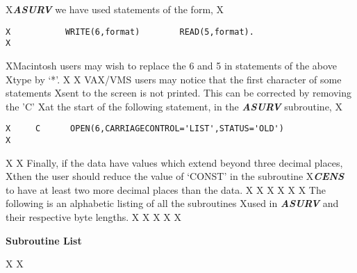 X{\sl\bf ASURV} we have used statements of the form,
X\begin{verbatim}
X           WRITE(6,format)        READ(5,format).
X\end{verbatim}
XMacintosh users may wish to replace the 6 and 5 in statements of the above
Xtype by `*'.
X           
X     VAX/VMS users may notice that the first character of some statements
Xsent to the screen is not printed.  This can be corrected by removing the 'C' 
Xat the start of the following statement, in the {\sl\bf ASURV} subroutine,
X\begin{verbatim}
X     C      OPEN(6,CARRIAGECONTROL='LIST',STATUS='OLD')
X\end{verbatim}
X
X     Finally, if the data have values which extend beyond three decimal places,
Xthen the user should reduce the value of `CONST' in the subroutine 
X{\sl\bf CENS} to have at least two more decimal places than the data.
X
X
X\newpage
X
X
X     The following is an alphabetic listing of all the subroutines 
Xused in {\sl\bf ASURV} and their respective byte lengths.
X
X
X\bigskip
X\bigskip
X\centerline{\large\bf Subroutine List}
X
X\bigskip
